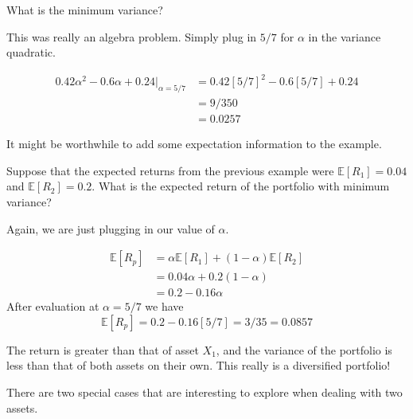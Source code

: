 \documentclass{ximera}
\begin{document}
\begin{question}
What is the minimum variance?

	\begin{multipleChoice}
	\end{multipleChoice}

\end{question}

\begin{solution}
This was really an algebra problem. Simply plug in $5/7$ for $\alpha$ in the variance quadratic.

	\begin{align*}
	0.42\alpha^2-0.6\alpha+0.24\vert_{\alpha=5/7}	&=0.42[5/7]^2-0.6[5/7]+0.24\\
									&=9/350\\
									&=0.0257
	\end{align*}
\end{solution}

It might be worthwhile to add some expectation information to the example.

\begin{example}
Suppose that the expected returns from the previous example were $\mathbb{E}[R_1]=0.04$ and $\mathbb{E}[R_2]=0.2$. What is the expected return of the portfolio with minimum variance?
\end{example}

\begin{solution}
Again, we are just plugging in our value of $\alpha$.

	\begin{align*}
	\mathbb{E}[R_p] 	&=\alpha\mathbb{E}[R_1]+(1-\alpha)\mathbb{E}[R_2]\\
				&=0.04\alpha+0.2(1-\alpha)\\
				&=0.2-0.16\alpha
	\end{align*}
After evaluation at $\alpha=5/7$ we have
	\begin{equation*}
	\mathbb{E}[R_p]=0.2-0.16[5/7]=3/35=0.0857
	\end{equation*}
\end{solution}

The return is greater than that of asset $X_1$, and the variance of the portfolio is less than that of both assets on their own. This really is a diversified portfolio!

There are two special cases that are interesting to explore when dealing with two assets.
\end{document}
